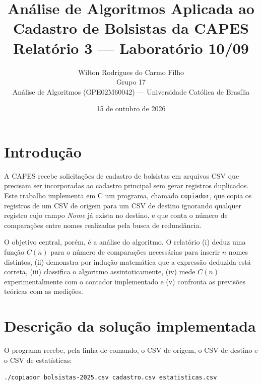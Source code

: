 \documentclass[11pt,a4paper]{article}
\title{Análise de Algoritmos Aplicada ao Cadastro de Bolsistas da CAPES\\[0.4em]
       \large Relatório 3 --- Laboratório 10/09}
\author{Wilton Rodrigues do Carmo Filho\\
        Grupo 17\\
        Análise de Algoritmos (GPE02M60042) --- Universidade Católica de Brasília}
\date{15 de outubro de 2026}
\begin{document}
\renewcommand{\proofname}{Demonstração}
\maketitle

\noindent{}

\tableofcontents

\section{Introdução}

A CAPES recebe solicitações de cadastro de bolsistas em arquivos CSV que precisam
ser incorporadas ao cadastro principal sem gerar registros duplicados. Este
trabalho implementa em C um programa, chamado \texttt{copiador}, que copia os
registros de um CSV de origem para um CSV de destino ignorando qualquer registro
cujo campo \emph{Nome} já exista no destino, e que conta o número de comparações
entre nomes realizadas pela busca de redundância.

O objetivo central, porém, é a análise do algoritmo. O relatório (i) deduz uma
função $C(n)$ para o número de comparações necessárias para inserir $n$ nomes
distintos, (ii) demonstra por indução matemática que a expressão deduzida
está correta, (iii) classifica o algoritmo assintoticamente, (iv) mede $C(n)$
experimentalmente com o contador implementado e (v) confronta as previsões
teóricas com as medições.

\section{Descrição da solução implementada}

O programa recebe, pela linha de comando, o CSV de origem, o CSV de destino e o
CSV de estatísticas:

\begin{center}\texttt{./copiador bolsistas-2025.csv cadastro.csv estatisticas.csv}\end{center}
\end{document}
